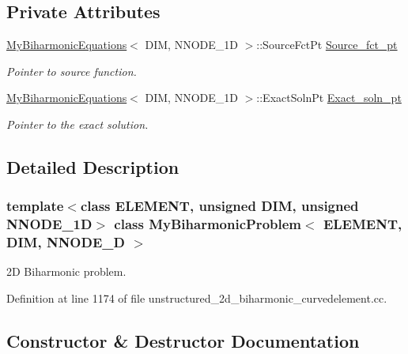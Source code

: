\subsection*{Private Attributes}
\begin{DoxyCompactItemize}
\item 
\hyperlink{classoomph_1_1MyBiharmonicEquations}{My\+Biharmonic\+Equations}$<$ D\+IM, N\+N\+O\+D\+E\+\_\+1D $>$\+::Source\+Fct\+Pt \hyperlink{classMyBiharmonicProblem_a1ba6c64955d32e319db7a7de7807458a}{Source\+\_\+fct\+\_\+pt}
\begin{DoxyCompactList}\small\item\em Pointer to source function. \end{DoxyCompactList}\item 
\hyperlink{classoomph_1_1MyBiharmonicEquations}{My\+Biharmonic\+Equations}$<$ D\+IM, N\+N\+O\+D\+E\+\_\+1D $>$\+::Exact\+Soln\+Pt \hyperlink{classMyBiharmonicProblem_a9f681412ab2041bf3ddcd668ee816362}{Exact\+\_\+soln\+\_\+pt}
\begin{DoxyCompactList}\small\item\em Pointer to the exact solution. \end{DoxyCompactList}\end{DoxyCompactItemize}


\subsection{Detailed Description}
\subsubsection*{template$<$class E\+L\+E\+M\+E\+NT, unsigned D\+IM, unsigned N\+N\+O\+D\+E\+\_\+1D$>$\newline
class My\+Biharmonic\+Problem$<$ E\+L\+E\+M\+E\+N\+T, D\+I\+M, N\+N\+O\+D\+E\+\_\+D $>$}

2D Biharmonic problem. 

Definition at line 1174 of file unstructured\+\_\+2d\+\_\+biharmonic\+\_\+curvedelement.\+cc.



\subsection{Constructor \& Destructor Documentation}
\mbox{\label{classMyBiharmonicProblem_ab894abf54210a71c3b4e00e1b30e380e}} 
